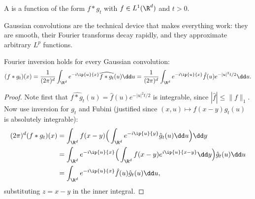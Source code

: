\begin{center}
\end{center}

\begin{definition}
	A  is a function of the form $f * g_t$ with $f \in L^1(\R^d)$ and $t>0$.
\end{definition}

Gaussian convolutions are the technical device that makes everything work: they are smooth, their Fourier transforms decay rapidly, and they approximate arbitrary $L^p$ functions.

\begin{lemma}\label{lem:gauss-conv-inv}
	Fourier inversion holds for every Gaussian convolution:
	$$
	(f*g_t)(x) = \frac{1}{(2\pi)^d}\int_{\R^d}e^{-i\ip{u}{x}}\widehat{f*g_t}(u)\dd u = \frac{1}{(2\pi)^d}\int_{\R^d}e^{-i\ip{u}{x}}\hat f(u)e^{-|u|^2t/2}\dd u.
	$$
\end{lemma}
\begin{proof}
	Note first that $\widehat{f*g_t}(u)=\hat f(u)e^{-|u|^2t/2}$ is integrable, since $|\hat f|\leq\|f\|_1$. Now use inversion for $g_t$ and Fubini (justified since $(x,u)\mapsto f(x-y)\hat g_t(u)$ is absolutely integrable):
	\begin{align*}
		(2\pi)^d (f*g_t)(x) &= \int_{\R^d}f(x-y)\Big(\int_{\R^d}e^{-i\ip{u}{y}}\hat g_t(u)\dd u\Big)\dd y\\
		&= \int_{\R^d}e^{-i\ip{u}{x}}\Big(\int_{\R^d}f(x-y)e^{i\ip{u}{x-y}}\dd y\Big)\hat g_t(u)\dd u\\
		&= \int_{\R^d}e^{-i\ip{u}{x}}\hat f(u)\hat g_t(u)\dd u,
	\end{align*}
	substituting $z=x-y$ in the inner integral.
\end{proof}

